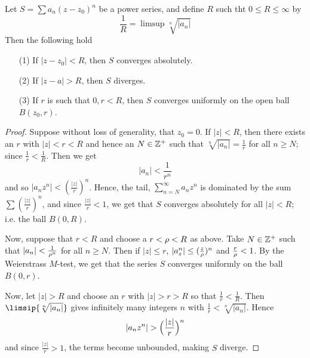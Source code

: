 \begin{theorem}\label{3.1.2}
    Let $S=\sum{a_n(z-z_0)^n}$ be a power series, and define $R$ such tht  $0
    \leq R \leq \infty$ by
    \begin{equation*}
        \frac{1}{R}=\limsup{\sqrt[n]{|a_n|}}
    \end{equation*}
    Then the following hold
    \begin{enumerate}
        \item[(1)] If $|z-z_0|<R$, then $S$ converges absolutely.

        \item[(2)] If $|z-a|>R$, then  $S$ diverges.

        \item[(3)] If $r$ is such that $0,r<R$, then  $S$ converges uniformly on
            the open ball $B(z_0,r)$.
    \end{enumerate}
\end{theorem}
\begin{proof}
    Suppose without loss of generality, that $z_0=0$. If $|z|<R$, then there
    exists an  $r$ with  $|z|<r<R$ and hence an  $N \in \mathbb{Z}^+$ such that
    $\sqrt[n]{|a_n|}=\frac{1}{r}$ for all $n \geq N$; since
    $\frac{1}{r}<\frac{1}{R}$. Then we get
    \begin{equation*}
        |a_n|<\frac{1}{r^n}
    \end{equation*}
    and so $|a_nz^n|<(\frac{|z|}{r})^n$. Hence, the tail,
    $\sum_{n=N}^\infty{a_nz^n}$ is dominated by the sum
    $\sum{(\frac{|z|}{r})^n}$, and since $\frac{|z|}{r}<1$, we get that $S$
    converges absolutely for all  $|z|<R$; i.e. the ball $B(0,R)$.

    Now, suppose that $r<R$ and choose a  $r<\rho<R$ as above. Take $N \in \mathbb{Z}^+$
    such that  $|a_n|<\frac{1}{\rho^n}$ for all $n \geq N$. Then if  $|z| \leq r$,
     $|a_z^n| \leq (\frac{z}{\rho})^n$ and $\frac{r}{\rho}<1$. By the Weierstrass
     $M$-test, we get that the series $S$ converges uniformly on the ball
     $B(0,r)$.

     Now, let $|z|>R$ and choose an  $r$ with  $|z|>r>R$ so that
     $\frac{1}{r}<\frac{1}{R}$. Then $\limsip{\sqrt[n]{|a_n|}}$ gives infinitely
     many integers $n$ with  $\frac{1}{r}<\sqrt[n]{|a_n|}$. Hence
     \begin{equation*}
         |a_nz^n|>\Big{(} \frac{|z|}{r} \Big{)}^n
     \end{equation*}
     and since $\frac{|z|}{r}>1$, the terms become unbounded, making $S$
     diverge.
\end{proof}

